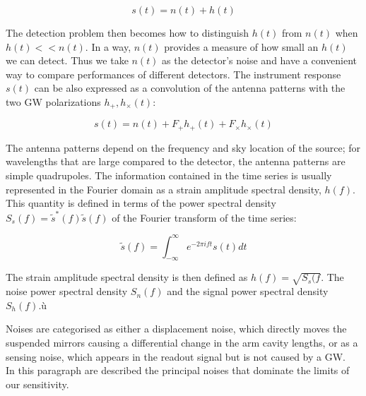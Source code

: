 \documentclass[binding=0.6cm, LaM]{sapthesis}
\begin{document}
                \begin{equation}
                s(t) = n(t) + h(t)
                \end{equation}

        The detection problem then becomes how to distinguish $h(t)$ from $n(t)$ when $h(t) << n(t)$.
        In a way, $n(t)$ provides a measure of how small an $h(t)$ we can detect.
        Thus we take $n(t)$ as the detector’s noise and have a convenient way to
        compare performances of different detectors.
	The instrument response $s(t)$ can be also expressed as a convolution of the antenna patterns 
	with the two GW polarizations $h_{+}, h_{\times}(t)$:
	
		\begin{equation}
		s(t) = n(t) +  F_{+}h_{+} (t) + F_{\times}h_{\times}(t)
		\end{equation} 

	The antenna patterns depend on the frequency and sky location of the source; 
	for wavelengths that are large compared to the detector, the antenna patterns are simple quadrupoles.
	The information contained in the time series is usually represented in the Fourier domain 
	as a strain amplitude spectral density, $h(f)$.
	This quantity is defined in terms of the power spectral density $S_s(f) = \tilde s^{*}(f) \tilde s(f)$
	of the Fourier transform of the time series:

		\begin{equation}
                \tilde s(f) = \int^{\infty}_{-\infty} e^{-2 \pi ift} s(t)dt
		\end{equation}

	The strain amplitude spectral density is then defined as $h(f) = \sqrt{S_s(f}$.
	The noise power spectral density $S_n(f)$ and the signal power spectral density $S_h(f)$.ù
  
	Noises are categorised as either a displacement noise, which directly moves the suspended mirrors
        causing a differential change in the arm cavity lengths, or as a sensing noise,
        which appears in the readout signal but is not caused by a GW. \\
        In this paragraph are described the principal noises that dominate the limits of our sensitivity.
\end{document}
